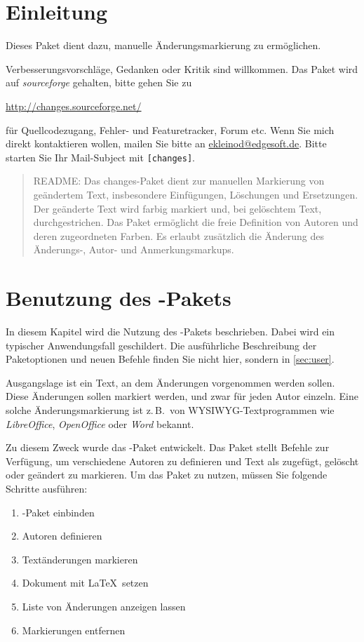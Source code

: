 \section{Einleitung}

Dieses Paket dient dazu, manuelle Änderungsmarkierung zu ermöglichen.

Verbesserungsvorschläge, Gedanken oder Kritik sind willkommen.
Das Paket wird auf \emph{sourceforge} gehalten, bitte gehen Sie zu

\url{http://changes.sourceforge.net/}

für Quellcodezugang, Fehler- und Featuretracker, Forum etc.
Wenn Sie mich direkt kontaktieren wollen, mailen Sie bitte an \href{mailto:ekleinod@edgesoft.de}{ekleinod@edgesoft.de}.
Bitte starten Sie Ihr Mail-Subject mit \texttt{[changes]}.

\begin{quote}
	\small\textsc{README:}
	Das changes-Paket dient zur manuellen Markierung von geändertem Text, insbesondere Einfügungen, Löschungen und Ersetzungen.
	Der geänderte Text wird farbig markiert und, bei gelöschtem Text, durchgestrichen.
	Das Paket ermöglicht die freie Definition von Autoren und deren zugeordneten Farben.
	Es erlaubt zusätzlich die Änderung des Änderungs-, Autor- und Anmerkungsmarkups.
\end{quote}


\section{Benutzung des -Pakets}
\label{sec:usage}

In diesem Kapitel wird die Nutzung des -Pakets beschrieben.
Dabei wird ein typischer Anwendungsfall geschildert.
Die ausführliche Beschreibung der Paketoptionen und neuen Befehle finden Sie nicht hier, sondern in \autoref{sec:user}.

Ausgangslage ist ein Text, an dem Änderungen vorgenommen werden sollen.
Diese Änderungen sollen markiert werden, und zwar für jeden Autor einzeln.
Eine solche Änderungsmarkierung ist z.\,B.\ von WYSIWYG-Textprogrammen wie \emph{LibreOffice}, \emph{OpenOffice} oder \emph{Word} bekannt.

Zu diesem Zweck wurde das -Paket entwickelt.
Das Paket stellt Befehle zur Verfügung, um verschiedene Autoren zu definieren und Text als zugefügt, gelöscht oder geändert zu markieren.
Um das Paket zu nutzen, müssen Sie folgende Schritte ausführen:
\begin{enumerate}
	\item {}-Paket einbinden
	\item Autoren definieren
	\item Textänderungen markieren
	\item Dokument mit \LaTeX\ setzen
	\item Liste von Änderungen anzeigen lassen
	\item Markierungen entfernen
\end{enumerate}

